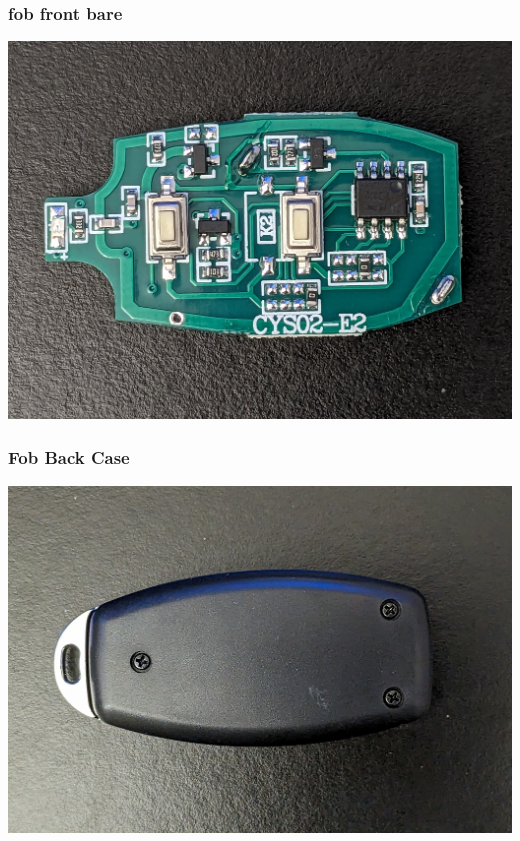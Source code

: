 \documentclass{beamer}
\begin{document}
\begin{frame}
\frametitle{fob front bare}
  \includegraphics[width=\textwidth]{../Pics/device/fob_front_bare.jpg}
\end{frame}

\begin{frame}
\frametitle{Fob Back Case}
  \includegraphics[width=\textwidth]{../Pics/device/fob_back_case.jpg}
\end{frame}
\end{document}
